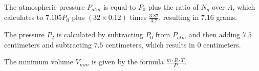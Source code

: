 The atmospheric pressure \( P_{atm} \) is equal to \( P_0 \) plus the ratio of \( N_g \) over \( A \), which calculates to \( 7.105P_0 \) plus \( (32 \times 0.12) \) times \( \frac{3.87}{3.7} \), resulting in \( 7.16 \) grams.

The pressure \( P_2 \) is calculated by subtracting \( P_0 \) from \( P_{atm} \) and then adding \( 7.5 \) centimeters and subtracting \( 7.5 \) centimeters, which results in \( 0 \) centimeters.

The minimum volume \( V_{min} \) is given by the formula \( \frac{m \cdot R \cdot T}{P} \).